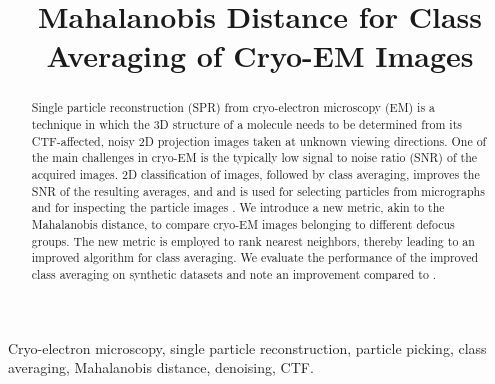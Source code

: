 \documentclass{article}
\title{Mahalanobis Distance for Class Averaging of Cryo-EM Images}
\begin{document}
%
\maketitle
%
\begin{abstract}
Single particle reconstruction (SPR) from cryo-electron microscopy (EM) is a technique in which the 3D structure of a molecule needs to be determined from its CTF-affected, noisy 2D projection images taken at unknown viewing directions. One of the main challenges in cryo-EM is the typically low signal to noise ratio (SNR) of the acquired images. 2D classification of images, followed by class averaging, improves the SNR of the resulting averages, and and is used for selecting particles from micrographs and for inspecting the particle images \cite{zhao}. We introduce a new metric, akin to the Mahalanobis distance, to compare cryo-EM images belonging to different defocus groups. The new metric is employed to rank nearest neighbors, thereby leading to an improved algorithm for class averaging. We evaluate the performance of the improved class averaging on synthetic datasets and note an improvement compared to \cite{zhao}.

\end{abstract}
%
\begin{keywords}
Cryo-electron microscopy, single particle reconstruction, particle picking, class averaging, Mahalanobis distance, denoising, CTF.
\end{keywords}
%
\end{document}
